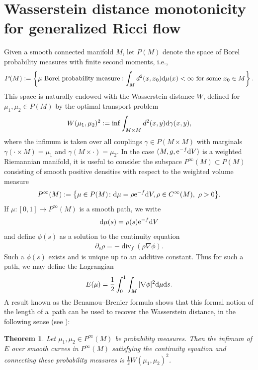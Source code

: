 \documentclass[11pt]{article}
\numberwithin{equation}{section}
\numberwithin{equation}{section}
\newtheorem{thm}{Theorem}[section]
\newcommand{\del}{\partial}
\newcommand{\N}{\nabla}
\DeclareMathOperator{\divg}{div}
\begin{document}
\section{Wasserstein distance monotonicity for generalized Ricci flow}

Given a smooth connected manifold $M$, let $P(M)$ denote the space of Borel probability measures with finite second moments, i.e.,
\begin{align*}
 P(M):=\left\{\mu \text{ Borel probability measure}: \int_Md^2(x,x_0) {\rm d}\mu(x)<\infty \text{ for some }x_0\in M\right\}.
\end{align*} This space is naturally endowed with the Wasserstein distance $W$, defined for $\mu_1,\mu_2\in P(M)$ by the optimal transport problem
\begin{align*}
 W(\mu_1,\mu_2)^2:=\inf\int_{M\times M}d^2(x,y) {\rm d}\gamma(x,y),
\end{align*}
where the infimum is taken over all couplings $\gamma\in P(M\times M)$ with marginals $\gamma(\cdot\times M)=\mu_1$ and $\gamma(M\times \cdot)=\mu_2$. In the case $(M, g, {\rm e}^{-f} {\rm d}V)$ is a weighted Riemannian manifold, it is useful to consider the subspace $P^\infty(M)\subset P(M)$ consisting of smooth positive densities with respect to the weighted volume measure
\begin{align*}
 P^\infty(M):=\bigl\{\mu\in P(M)\colon {\rm d}\mu=\rho {\rm e}^{-f} {\rm d}V, \rho\in C^\infty(M),\ \rho>0\bigr\}.
\end{align*}
If $\mu\colon[0,1]\to P^\infty(M)$ is a smooth path, we write
\begin{align*}
 {\rm d}\mu(s)=\rho(s) {\rm e}^{-f} {\rm d}V
\end{align*}
and define $\phi(s)$ as a solution to the continuity equation
\begin{align}\label{eq: conteqstatic}
 \del_s\rho=-\divg_f(\rho\N\phi).
\end{align}
Such a $\phi(s)$ exists and is unique up to an additive constant.
Thus for such a path, we may define the Lagrangian
\begin{align*}
 E(\mu)=\frac12\int_0^1\int_M |\N\phi|^2 {\rm d}\mu {\rm d}s.
\end{align*}
A result known as the Benamou--Brenier formula shows that this formal notion of the length of a~path can be used to recover the Wasserstein distance, in the following sense (see \cite[Proposition~4.3]{OW05}):
\begin{thm}\label{thm: existence}
Let $\mu_1,\mu_2\in P^\infty(M)$ be probability measures. Then the infimum of $E$ over smooth curves in $P^\infty(M)$ satisfying the continuity equation and connecting these probability measures is $\frac12 W(\mu_1,\mu_2)^2$.
\end{thm}
\end{document}
